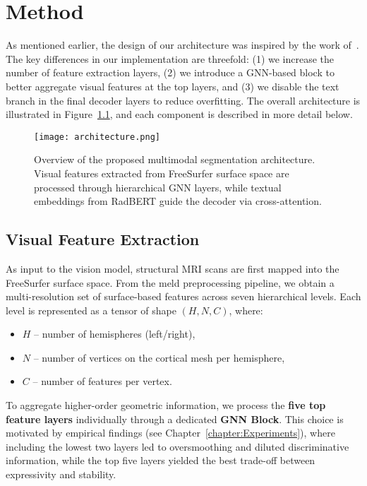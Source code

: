 \documentclass[FCD_GNN.tex]{subfiles}
\begin{document}
\chapter{Method}

As mentioned earlier, the design of our architecture was inspired by the work of~\cite{Zhong2023Ariadne}. 
The key differences in our implementation are threefold: 
(1) we increase the number of feature extraction layers, 
(2) we introduce a GNN-based block to better aggregate visual features at the top layers, 
and (3) we disable the text branch in the final decoder layers to reduce overfitting. 
The overall architecture is illustrated in Figure~\ref{fig:architecture}, 
and each component is described in more detail below.

\begin{figure}[htbp]
    \centering
    \texttt{[image: architecture.png]}
    \caption{Overview of the proposed multimodal segmentation architecture. 
    Visual features extracted from FreeSurfer surface space are processed through hierarchical GNN layers, 
    while textual embeddings from RadBERT guide the decoder via cross-attention.}
    \label{fig:architecture}
\end{figure}

\section{Visual Feature Extraction}

As input to the vision model, structural MRI scans are first mapped into the FreeSurfer surface space.  
From the \ac{meld} preprocessing pipeline, we obtain a multi-resolution set of surface-based features across 
seven hierarchical levels. Each level is represented as a tensor of shape $(H, N, C)$, where:  

\begin{itemize}
    \item $H$ – number of hemispheres (left/right),
    \item $N$ – number of vertices on the cortical mesh per hemisphere,
    \item $C$ – number of features per vertex.
\end{itemize}

To aggregate higher-order geometric information, we process the \textbf{five top feature layers} individually through a dedicated \textbf{GNN Block}.  
This choice is motivated by empirical findings (see Chapter~\ref{chapter:Experiments}), where including the lowest two layers led to oversmoothing and diluted 
discriminative information, while the top five layers yielded the best trade-off between expressivity and stability.  
\end{document}

